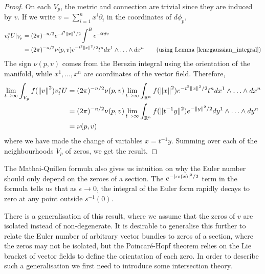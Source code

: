 \begin{proof}
	On each $V_p$, the metric and connection are trivial since they are induced 
	by $v$. If we write $v= \sum_{i=1}^{n} x^i \partial_i$ in the coordinates of
	$d\phi_p$,
	\begin{align*}
		v_t^*U |_{V_p} 
		&= (2\pi)^{-n/2} e^{-t^2\norm{x}^2 /2} \int^B e^{-itdv} \\
		&= (2\pi)^{-n/2} \nu(p,v) e^{-t^2\norm{x}^2 /2} t^n dx^1 \wedge
		\ldots\wedge dx^n \tag{using Lemma \ref{lem:gaussian_integral}}
	\end{align*}
	The sign $\nu(p,v)$ comes from the Berezin integral using the orientation of
	the manifold, while $x^1,\ldots,x^n$ are coordinates of the vector field. 
	Therefore, 
	\begin{align*}
		\lim_{t \to \infty} \int_{V_p} f(\norm{v}^2)v_t^*U 
		&= (2\pi)^{-n/2} \nu(p,v) 
		\lim_{t \to \infty} \int_{\mathbb{R}^n}
		f(\norm{x}^2) e^{-t^2\norm{x}^2 /2} t^n dx^1 \wedge \ldots\wedge dx^n\\
		&= (2\pi)^{-n/2} \nu(p,v) 
		\lim_{t \to \infty} \int_{\mathbb{R}^n} 
		f(\norm[*]{t^{-1}y}^2) e^{-\norm{y}^2 /2} dy^1 \wedge \ldots\wedge dy^n\\
		&= \nu(p,v) 
	\end{align*}
	where we have made the change of variables $x=t^{-1}y$. Summing over each of
	the neighbourhoods $V_p$ of zeros, we get the result.
\end{proof}
The Mathai-Quillen formula also gives us intuition on why the Euler number
should only depend on the zeroes of a section. 
The $e^{-\abs{\epsilon s(x)}^2/2}$ term in the formula tells us that as
$\epsilon \to 0$, the integral of the Euler form rapidly decays to zero at any
point outside $s^{-1}(0)$. 

There is a generalisation of this result, where we assume that the zeros
of $v$ are isolated instead of non-degenerate.\cite[Theorem 1.58]{bgv} 
It is desirable to generalise this further to relate the Euler number of
arbitrary vector bundles to zeros of a section, where the zeros may not be
isolated, but the Poincar\'e-Hopf theorem
relies on the Lie bracket of vector fields to define the orientation of each
zero. In order to describe such a generalisation we first need to introduce some
intersection theory.

